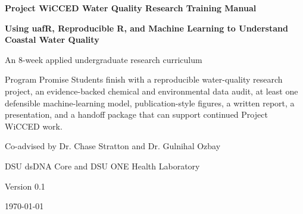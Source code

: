 \documentclass[11pt,oneside]{book}
\begin{document}

\begin{titlepage}
\pagecolor{DSULightBlue}
\begin{center}
\vspace*{0.35in}
\CoreLogo

\vspace{0.45in}
{\Huge\bfseries\color{DSURed} Project WiCCED Water Quality Research Training Manual\par}
\vspace{0.18in}
{\Large\bfseries Using uafR, Reproducible R, and Machine Learning to Understand Coastal Water Quality\par}
\vspace{0.30in}
{\large An 8-week applied undergraduate research curriculum\par}

\vfill
\begin{programbox}[width=0.88\textwidth]{Program Promise}
Students finish with a reproducible water-quality research project, an evidence-backed chemical and environmental data audit, at least one defensible machine-learning model, publication-style figures, a written report, a presentation, and a handoff package that can support continued Project WiCCED work.
\end{programbox}

\vfill
{\large Co-advised by Dr. Chase Stratton and Dr. Gulnihal Ozbay\par}
{\large DSU dsDNA Core and DSU ONE Health Laboratory\par}
{\large Version 0.1\par}
{\large \today\par}
\end{center}
\end{titlepage}
\nopagecolor

\frontmatter
\tableofcontents

\mainmatter











\appendix


\backmatter
\nocite{projectwiccedHome,projectwiccedAbout,projectwiccedResearch,projectwiccedEducation,projectwiccedArchive,ozbayProfile,strattonProfile,uafrPlos,dnrecMonitoring,paudel2022,ozbay2017,yan2024,dnrecMarshMigration}


\end{document}
